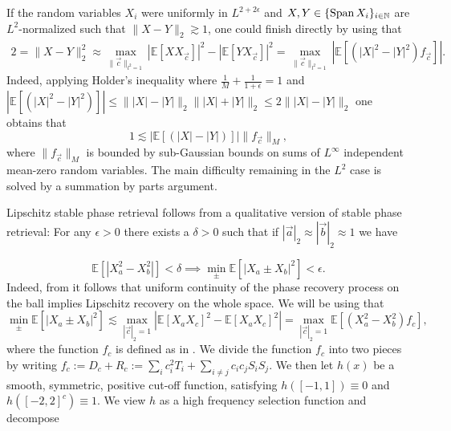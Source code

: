 \documentclass{inprogress}
\newcommand{\Span}{\operatorname{Span}}
\begin{document}
If the random variables $X_i$ were uniformly in $L^{2+2\epsilon}$ and $X, Y\in \{\Span X_i\}_{i\in \NN}$ are $L^2$-normalized such that $\|X-Y\|_{2}\gtrsim 1$, one could finish directly by using that 
$$
\begin{aligned}
    2 = \|X-Y\|_2^2 \approx \max_{\|\vec c\|_{l^2 = 1}} |\mathbb E[X X_{\vec c}]|^2- |\mathbb E[Y X_{\vec c}]|^2
    = 
    \max_{\|\vec c\|_{l^2 = 1}} |\mathbb E[(|X|^2-|Y|^2) f_{\vec c}]|.
\end{aligned}
$$
Indeed, applying Holder's inequality
where $\frac 1  M + \frac{1}{1+\epsilon} = 1$ and $ |\mathbb E[(|X|^2-|Y|^2) ]| \le \||X|-|Y|\|_{2} \||X|+|Y|\|_{2}\le 2  \||X|-|Y|\|_{2}$ one obtains that
$$
    1\lesssim |\mathbb E[(|X|-|Y|) ]| \|f_{\vec c}\|_M,
$$
where $\|f_{\vec c}\|_M$ is bounded by sub-Gaussian bounds on sums of $L^\infty$ independent mean-zero random variables. The main difficulty remaining in the $L^2$ case is solved by a summation by parts argument. 


\newcommand{\twonorm}[1]{|\vec #1|_2}
\newcommand{\EE}[1]{\mathbb E \!\left[#1\right]}

Lipschitz stable phase retrieval follows from a qualitative version of stable phase retrieval: For any $\epsilon>0$ there exists a $\delta>0$ such that if $\twonorm a \approx \twonorm b \approx 1$ we have 

$$
\EE{|X_a^2-X_b^2|} <\delta \implies \min_\pm \EE{|X_a\pm X_b|^2} <\epsilon.
$$
Indeed, from  it follows that uniform continuity of the phase recovery process on the ball implies Lipschitz recovery on the whole space.
We will be using that
$$\min_\pm\EE{|X_a\pm X_b|^2}  \lesssim  \max_{\twonorm c = 1} |\EE{X_aX_c}^2 -  \EE{X_aX_c}^2 | = \max_{\twonorm c = 1} \EE{(X_a^2-X_b^2) f_c},$$ %
where the function $f_{c}$ is defined as in . We divide the function $f_c$ into two pieces by writing $f_c:= D_c + R_c := \sum_{i} c_i^2 T_i + \sum_{i\neq j} c_i c_j S_iS_j$. We then let $h(x)$ be a smooth, symmetric, positive cut-off function, satisfying $h([-1,1]) \equiv 0$ and $h([-2,2]^c) \equiv 1$. We view $h$ as a high frequency selection function and decompose
\end{document}
